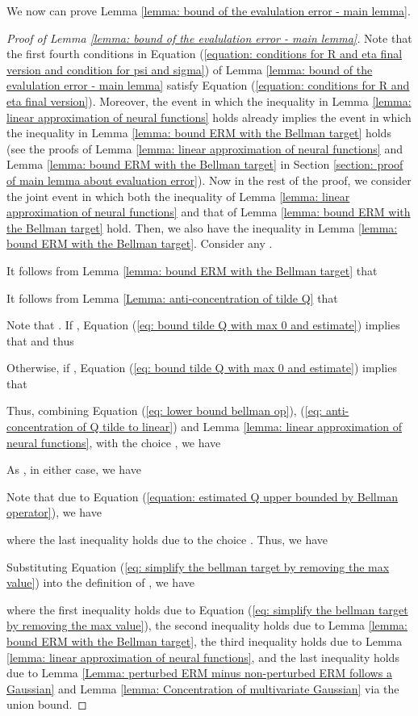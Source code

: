 \documentclass{article} \usepackage{iclr2023/iclr2023_conference,times}
\begin{document}
We now can prove Lemma \ref{lemma: bound of the evalulation error - main lemma}. 
\begin{proof}[Proof of Lemma \ref{lemma: bound of the evalulation error - main lemma}]
Note that the first fourth conditions in Equation (\ref{equation: conditions for R and eta final version and condition for psi and sigma}) of Lemma \ref{lemma: bound of the evalulation error - main lemma} satisfy Equation (\ref{equation: conditions for R and eta final version}). Moreover, the event in which the inequality in Lemma \ref{lemma: linear approximation of neural functions} holds already implies the event in which the inequality in Lemma \ref{lemma: bound ERM with the Bellman target} holds (see the proofs of Lemma \ref{lemma: linear approximation of neural functions} and Lemma \ref{lemma: bound ERM with the Bellman target} in Section \ref{section: proof of main lemma about evaluation error}). Now in the rest of the proof, we consider the joint event in which both the inequality of Lemma \ref{lemma: linear approximation of neural functions} and that of Lemma \ref{lemma: bound ERM with the Bellman target} hold. Then, we also have the inequality in Lemma \ref{lemma: bound ERM with the Bellman target}. Consider any . 



It follows from Lemma \ref{lemma: bound ERM with the Bellman target} that


It follows from Lemma \ref{Lemma: anti-concentration of tilde Q} that 


Note that . If , Equation (\ref{eq: bound tilde Q with max 0 and estimate}) implies that  and thus 


Otherwise, if , 
Equation (\ref{eq: bound tilde Q with max 0 and estimate}) implies that

Thus, combining Equation (\ref{eq: lower bound bellman op}), (\ref{eq: anti-concentration of Q tilde to linear})
and Lemma \ref{lemma: linear approximation of neural functions}, with the choice , we have


As , in either case, we have 


Note that due to Equation (\ref{equation: estimated Q upper bounded by Bellman operator}), we have

where the last inequality holds due to the choice . Thus, we have 


Substituting Equation (\ref{eq: simplify the bellman target by removing the max value}) into the definition of , we have

where the first inequality holds due to Equation (\ref{eq: simplify the bellman target by removing the max value}), the second inequality holds due to Lemma \ref{lemma: bound ERM with the Bellman target}, the third inequality holds due to Lemma \ref{lemma: linear approximation of neural functions}, and the last inequality holds due to Lemma \ref{Lemma: perturbed ERM minus non-perturbed ERM follows a Gaussian} and Lemma \ref{lemma: Concentration of multivariate Gaussian} via the union bound.

\end{proof}
\end{document}
